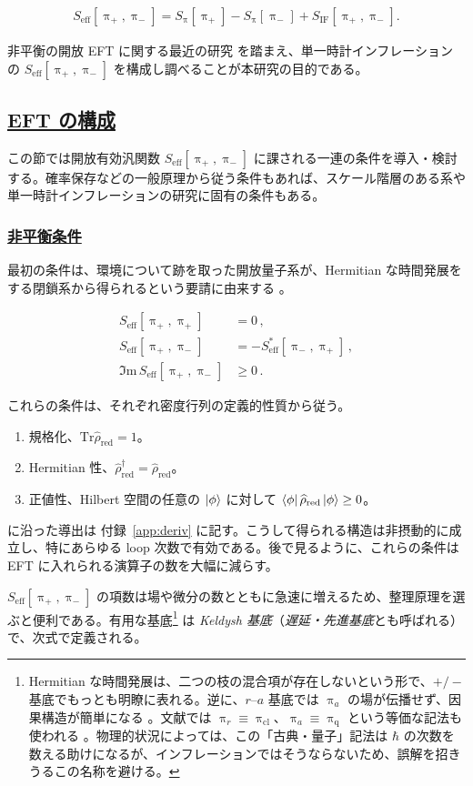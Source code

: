 \documentclass[a4paper,11pt]{ltjsarticle}
\newcommand{\subsectionlink}[1]{\subsection[#1]{\hyperlink{toc}{#1}}}
\numberwithin{equation}{section}
\newcommand{\subsubsectionlink}[1]{\subsubsection[#1]{\hyperlink{toc}{#1}}}
\def\uppiq{\uppi_{\text{q}}}
\def\uppicl{\uppi_{\text{cl}}}
\def\uppia{\uppi_{a}}
\def\uppir{\uppi_{r}}
\newcommand{\Tr}{\mathrm{Tr}}
\newcommand{\Ima}{\Im \mathrm{m}\,}
\newcommand{\App}[1]{Appendix~\ref{#1}}
\renewcommand{\App}[1]{付録~\ref{#1}}
\begin{document}
\begin{align}\label{eq:Seffref}
S_{\mathrm{eff}}\left[ \uppi_+, \uppi_-\right] = S_\uppi\left[\uppi_+\right] - S_\uppi\left[\uppi_-\right] + S_{\mathrm{IF}}\left[\uppi_+,\uppi_- \right].
\end{align}

非平衡の開放 EFT に関する最近の研究 \cite{Crossley:2015evo,Boyanovsky:2015xoa,Glorioso:2016gsa,Liu:2018kfw,Hongo:2018ant,Oppenheim:2023izn,Akyuz:2023lsm} を踏まえ、単一時計インフレーションの $S_{\mathrm{eff}}[\uppi_+,\uppi_-]$ を構成し調べることが本研究の目的である。

\subsectionlink{EFT の構成}\label{subsec:EFT}

この節では開放有効汎関数 $S_{\mathrm{eff}}[\uppi_+,\uppi_-]$ に課される一連の条件を導入・検討する。確率保存などの一般原理から従う条件もあれば、スケール階層のある系や単一時計インフレーションの研究に固有の条件もある。

\subsubsectionlink{非平衡条件}

最初の条件は、環境について跡を取った開放量子系が、Hermitian な時間発展をする閉鎖系から得られるという要請に由来する \cite{breuerTheoryOpenQuantum2002,Crossley:2015evo,Glorioso:2016gsa,Liu:2018kfw}。

\begin{align}
S_{\mathrm{eff}} \left[\uppi_+,\uppi_+\right] &= 0\,,  \\
    S_{\mathrm{eff}} \left[\uppi_+,\uppi_-\right] &= - 	S^*_{\mathrm{eff}} \left[\uppi_-,\uppi_+\right] \,, \\
    \Ima S_{\mathrm{eff}} \left[\uppi_+,\uppi_-\right] &\geq 0 \,.
\end{align}

これらの条件は、それぞれ密度行列の定義的性質から従う。
\begin{enumerate}
\item 規格化、$\Tr\widehat{\rho}_{\mathrm{red}}=1$。
\item Hermitian 性、$\widehat{\rho}_{\mathrm{red}}^\dagger=\widehat{\rho}_{\mathrm{red}}$。
\item 正値性、Hilbert 空間の任意の $\ket{\phi}$ に対して $\bra{\phi}\widehat{\rho}_{\mathrm{red}}\ket{\phi}\geq0$。
\end{enumerate}
\cite{Glorioso:2016gsa} に沿った導出は \App{app:deriv} に記す。こうして得られる構造は非摂動的に成立し、特にあらゆる loop 次数で有効である。後で見るように、これらの条件は EFT に入れられる演算子の数を大幅に減らす。

$S_{\mathrm{eff}}[\uppi_+,\uppi_-]$ の項数は場や微分の数とともに急速に増えるため、整理原理を選ぶと便利である。有用な基底\footnote{Hermitian な時間発展は、二つの枝の混合項が存在しないという形で、$+/-$ 基底でもっとも明瞭に表れる。逆に、$r$--$a$ 基底では $\uppi_a$ の場が伝播せず、因果構造が簡単になる \cite{kamenev_2011}。文献では $\uppir\equiv\uppicl$、$\uppia\equiv\uppiq$ という等価な記法も使われる \cite{kamenev_2011,Radovskaya:2020lns}。物理的状況によっては、この「古典・量子」記法は $\hbar$ の次数を数える助けになるが、インフレーションではそうならないため、誤解を招きうるこの名称を避ける。} は \textit{Keldysh 基底}（\textit{遅延・先進基底}とも呼ばれる）で、次式で定義される。
\end{document}
